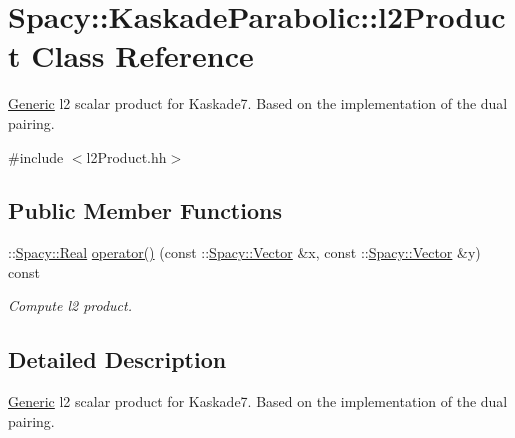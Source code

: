 \hypertarget{classSpacy_1_1KaskadeParabolic_1_1l2Product}{\section{Spacy\-:\-:Kaskade\-Parabolic\-:\-:l2\-Product Class Reference}
\label{classSpacy_1_1KaskadeParabolic_1_1l2Product}
}


\hyperlink{namespaceSpacy_1_1Generic}{Generic} l2 scalar product for Kaskade7. Based on the implementation of the dual pairing.  




{\ttfamily \#include $<$l2\-Product.\-hh$>$}

\subsection*{Public Member Functions}
\begin{DoxyCompactItemize}
\item 
\-::\hyperlink{classSpacy_1_1Real}{Spacy\-::\-Real} \hyperlink{classSpacy_1_1KaskadeParabolic_1_1l2Product_a4c2cdce62426197633ed90c665b318cf}{operator()} (const \-::\hyperlink{classSpacy_1_1Vector}{Spacy\-::\-Vector} \&x, const \-::\hyperlink{classSpacy_1_1Vector}{Spacy\-::\-Vector} \&y) const 
\begin{DoxyCompactList}\small\item\em Compute l2 product. \end{DoxyCompactList}\end{DoxyCompactItemize}


\subsection{Detailed Description}
\hyperlink{namespaceSpacy_1_1Generic}{Generic} l2 scalar product for Kaskade7. Based on the implementation of the dual pairing. 


